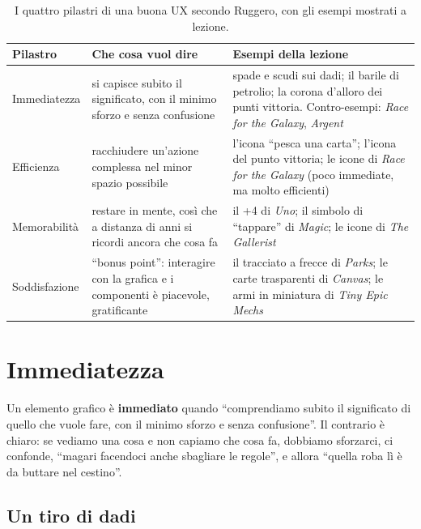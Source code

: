 \begin{table}[htbp]
\centering
\small
\begin{tabular}{@{}p{2.6cm}p{5.4cm}p{5.2cm}@{}}
\toprule
\textbf{Pilastro} & \textbf{Che cosa vuol dire} & \textbf{Esempi della lezione} \\
\midrule
Immediatezza & si capisce subito il significato, con il minimo sforzo e senza
confusione & spade e scudi sui dadi; il barile di petrolio; la corona d'alloro dei
punti vittoria. Contro-esempi: \emph{Race for the Galaxy}, \emph{Argent} \\
Efficienza & racchiudere un'azione complessa nel minor spazio possibile & l'icona
``pesca una carta''; l'icona del punto vittoria; le icone di \emph{Race for the
Galaxy} (poco immediate, ma molto efficienti) \\
Memorabilità & restare in mente, così che a distanza di anni si ricordi ancora che
cosa fa & il +4 di \emph{Uno}; il simbolo di ``tappare'' di \emph{Magic}; le icone di
\emph{The Gallerist} \\
Soddisfazione & ``bonus point'': interagire con la grafica e i componenti è piacevole,
gratificante & il tracciato a frecce di \emph{Parks}; le carte trasparenti di
\emph{Canvas}; le armi in miniatura di \emph{Tiny Epic Mechs} \\
\bottomrule
\end{tabular}
\caption{I quattro pilastri di una buona UX secondo Ruggero, con gli esempi mostrati
a lezione.}
\label{a10:tab:pilastri}
\end{table}

\section{Immediatezza}
\label{a10:sec:immediatezza}

Un elemento grafico è \textbf{immediato} quando ``comprendiamo subito il significato
di quello che vuole fare, con il minimo sforzo e senza confusione''. Il contrario è
chiaro: se vediamo una cosa e non capiamo che cosa fa, dobbiamo sforzarci, ci
confonde, ``magari facendoci anche sbagliare le regole'', e allora ``quella roba lì è
da buttare nel cestino''.

\subsection{Un tiro di dadi}



